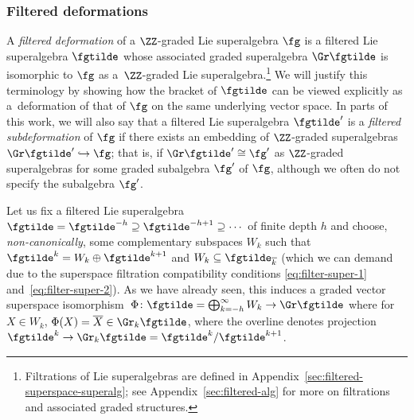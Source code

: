 \subsubsection{Filtered deformations}
\label{sec:filtered-def}

A \emph{filtered deformation} of a $\ZZ$-graded Lie superalgebra $\fg$ is a filtered Lie superalgebra $\fgtilde$ whose associated graded superalgebra $\Gr \fgtilde$ is isomorphic to $\fg$ as a~$\ZZ$-graded Lie superalgebra.\footnote{Filtrations of Lie superalgebras are defined in Appendix~\ref{sec:filtered-superspace-superalg}; see Appendix~\ref{sec:filtered-alg} for more on filtrations and associated graded structures.} We will justify this terminology by showing how the bracket of $\fgtilde$ can be viewed explicitly as a~deformation of that of $\fg$ on the same underlying vector space. In parts of this work, we will also say that a filtered Lie superalgebra $\fgtilde'$ is a \emph{filtered subdeformation} of $\fg$ if there exists an embedding of $\ZZ$-graded superalgebras $\Gr\fgtilde'\hookrightarrow \fg$; that is, if $\Gr\fgtilde'\cong\fg'$ as $\ZZ$-graded superalgebras for some graded subalgebra $\fg'$ of $\fg$, although we often do not specify the subalgebra $\fg'$.

Let us fix a filtered Lie superalgebra $\fgtilde=\fgtilde^{-h}\supseteq \fgtilde^{-h+1} \supseteq \cdots $ of finite depth $h$ and choose, \textit{non-canonically}, some complementary subspaces $W_k$ such that $\fgtilde^k=W_k\oplus\fgtilde^{k+1}$ and $W_k\subseteq\fgtilde_{\overline k}$ (which we can demand due to the superspace filtration compatibility conditions \eqref{eq:filter-super-1} and~\eqref{eq:filter-super-2}). As we have already seen, this induces a graded vector superspace isomorphism~${\Phi\colon\fgtilde=\bigoplus_{k=-h}^\infty W_k\to \Gr\fgtilde}$ where for $X\in W_k$, $\Phi(X)=\overline{X}\in\Gr_k\fgtilde$, where the overline denotes projection $\fgtilde^k\to\Gr_k\fgtilde=\fgtilde^k/\fgtilde^{k+1}$.

